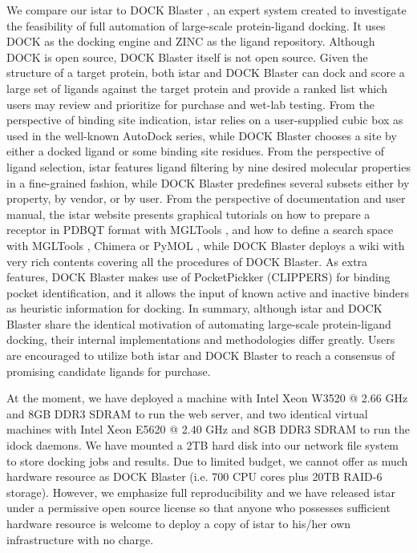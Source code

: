 \documentclass[10pt]{article}
\begin{document}
We compare our istar to DOCK Blaster \cite{557}, an expert system created to investigate the feasibility of full automation of large-scale protein-ligand docking. It uses DOCK \cite{1222} as the docking engine and ZINC \cite{532,1178} as the ligand repository. Although DOCK is open source, DOCK Blaster itself is not open source. Given the structure of a target protein, both istar and DOCK Blaster can dock and score a large set of ligands against the target protein and provide a ranked list which users may review and prioritize for purchase and wet-lab testing. From the perspective of binding site indication, istar relies on a user-supplied cubic box as used in the well-known AutoDock series, while DOCK Blaster chooses a site by either a docked ligand or some binding site residues. From the perspective of ligand selection, istar features ligand filtering by nine desired molecular properties in a fine-grained fashion, while DOCK Blaster predefines several subsets either by property, by vendor, or by user. From the perspective of documentation and user manual, the istar website presents graphical tutorials on how to prepare a receptor in PDBQT format with MGLTools \cite{596}, and how to define a search space with MGLTools \cite{596}, Chimera \cite{1219} or PyMOL \cite{1221}, while DOCK Blaster deploys a wiki with very rich contents covering all the procedures of DOCK Blaster. As extra features, DOCK Blaster makes use of PocketPickker (CLIPPERS) \cite{395} for binding pocket identification, and it allows the input of known active and inactive binders as heuristic information for docking. In summary, although istar and DOCK Blaster share the identical motivation of automating large-scale protein-ligand docking, their internal implementations and methodologies differ greatly. Users are encouraged to utilize both istar and DOCK Blaster to reach a consensus of promising candidate ligands for purchase.

At the moment, we have deployed a machine with Intel Xeon W3520 @ 2.66 GHz and 8GB DDR3 SDRAM to run the web server, and two identical virtual machines with Intel Xeon E5620 @ 2.40 GHz and 8GB DDR3 SDRAM to run the idock daemons. We have mounted a 2TB hard disk into our network file system to store docking jobs and results. Due to limited budget, we cannot offer as much hardware resource as DOCK Blaster (i.e. 700 CPU cores plus 20TB RAID-6 storage). However, we emphasize full reproducibility and we have released istar under a permissive open source license so that anyone who possesses sufficient hardware resource is welcome to deploy a copy of istar to his/her own infrastructure with no charge.
\end{document}
